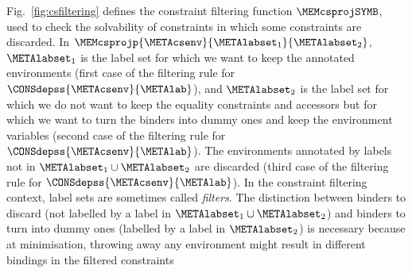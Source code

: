 \documentclass{jfp1}
\begin{document}
Fig.~\ref{fig:csfiltering} defines
%
%
%
the constraint filtering
function $\MEMcsprojSYMB$, used to check the
solvability of constraints in which some constraints are
discarded.
%
%
%
%
%
%
In $\MEMcsprojp{\METAcsenv}{\METAlabset_1}{\METAlabset_2}$,
$\METAlabset_1$ is the label set for which we want to keep the
annotated environments (first case of the filtering rule for
$\CONSdepss{\METAcsenv}{\METAlab}$), and $\METAlabset_2$ is the label
set for which we do not want to keep the equality constraints and
accessors but for which we want to turn the binders into dummy ones
and keep the environment variables (second case of the filtering rule
for $\CONSdepss{\METAcsenv}{\METAlab}$).  The environments annotated
by labels not in $\METAlabset_1\cup\METAlabset_2$ are
discarded (third case of the filtering rule for
$\CONSdepss{\METAcsenv}{\METAlab}$).
%
In the constraint filtering context, label sets are sometimes
called
%
%
%
\emph{filters}.
%
The distinction between binders to discard (not labelled by
a label in $\METAlabset_1\cup\METAlabset_2$) and binders to
turn into dummy ones (labelled by a label in $\METAlabset_2$) is
necessary because at minimisation, throwing away any environment
might result in different bindings in the filtered constraints
\end{document}
